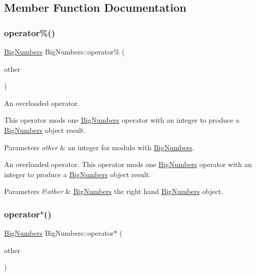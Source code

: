 \subsection{Member Function Documentation}
\mbox{\label{class_big_numbers_a397facc00a6e8867c162bd0b65aab7c3}} 
\subsubsection{\texorpdfstring{operator\%()}{operator\%()}}
{\footnotesize\ttfamily \mbox{\hyperlink{class_big_numbers}{Big\+Numbers}} Big\+Numbers\+::operator\% (\begin{DoxyParamCaption}\item[{int}]{other }\end{DoxyParamCaption})}



An overloaded operator. 

This operator mods one \mbox{\hyperlink{class_big_numbers}{Big\+Numbers}} operator with an integer to produce a \mbox{\hyperlink{class_big_numbers}{Big\+Numbers}} object result. 
\begin{DoxyParams}{Parameters}
{\em other} & an integer for modulo with \mbox{\hyperlink{class_big_numbers}{Big\+Numbers}}.\\
\hline
\end{DoxyParams}
An overloaded operator. This operator mods one \mbox{\hyperlink{class_big_numbers}{Big\+Numbers}} operator with an integer to produce a \mbox{\hyperlink{class_big_numbers}{Big\+Numbers}} object result. 
\begin{DoxyParams}{Parameters}
{\em \&other} & \mbox{\hyperlink{class_big_numbers}{Big\+Numbers}} the right hand \mbox{\hyperlink{class_big_numbers}{Big\+Numbers}} object. \\
\hline
\end{DoxyParams}
\mbox{\label{class_big_numbers_a419de516c4d9799decdb604d0dbef9a4}} 
\subsubsection{\texorpdfstring{operator$\ast$()}{operator*()}\hspace{0.1cm}{\footnotesize\ttfamily [1/2]}}
{\footnotesize\ttfamily \mbox{\hyperlink{class_big_numbers}{Big\+Numbers}} Big\+Numbers\+::operator$\ast$ (\begin{DoxyParamCaption}\item[{\mbox{\hyperlink{class_big_numbers}{Big\+Numbers}} \&}]{other }\end{DoxyParamCaption})}



